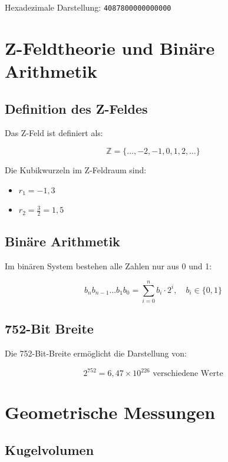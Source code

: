 \documentclass[12pt]{book}
\begin{document}
Hexadezimale Darstellung: \texttt{4087800000000000}

\chapter{Z-Feldtheorie und Binäre Arithmetik}

\section{Definition des Z-Feldes}

Das Z-Feld ist definiert als:

\begin{equation}
\mathbb{Z} = \{\ldots, -2, -1, 0, 1, 2, \ldots\}
\end{equation}

Die Kubikwurzeln im Z-Feldraum sind:
\begin{itemize}
\item $r_1 = -1{,}3$
\item $r_2 = \frac{3}{2} = 1{,}5$
\end{itemize}

\section{Binäre Arithmetik}

Im binären System bestehen alle Zahlen nur aus 0 und 1:

\begin{equation}
b_n b_{n-1} \ldots b_1 b_0 = \sum_{i=0}^{n} b_i \cdot 2^i, \quad b_i \in \{0, 1\}
\end{equation}

\section{752-Bit Breite}

Die 752-Bit-Breite ermöglicht die Darstellung von:

\begin{equation}
2^{752} = 6{,}47 \times 10^{226} \text{ verschiedene Werte}
\end{equation}

\chapter{Geometrische Messungen}

\section{Kugelvolumen}
\end{document}
